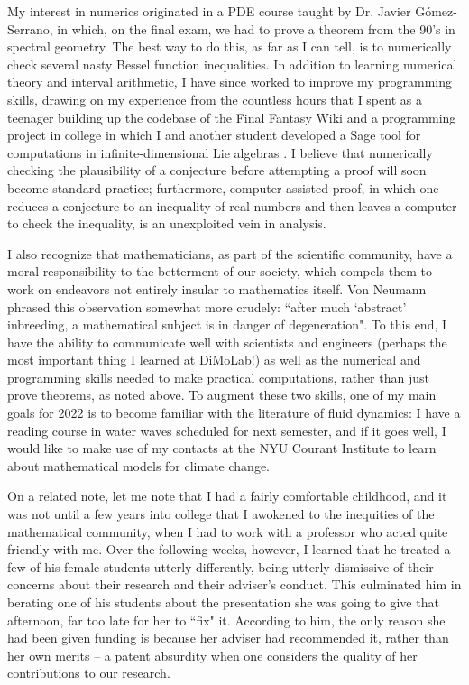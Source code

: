 \documentclass[11pt]{article}
\begin{document}
My interest in numerics originated in a PDE course taught by Dr. Javier G\'omez-Serrano, in which, on the final exam, we had to prove a theorem from the 90's in spectral geometry.
The best way to do this, as far as I can tell, is to numerically check several nasty Bessel function inequalities.
In addition to learning numerical theory and interval arithmetic, I have since worked to improve my programming skills, drawing on my experience from the countless hours that I spent as a teenager building up the codebase of the Final Fantasy Wiki \cite{ffwiki}
and a programming project in college in which I and another student developed a Sage tool for computations in infinite-dimensional Lie algebras \cite{lin2019}.
I believe that numerically checking the plausibility of a conjecture before attempting a proof will soon become standard practice; furthermore, computer-assisted proof, in which one reduces a conjecture to an inequality of real numbers and then leaves a computer to check the inequality, is an unexploited vein in analysis.

I also recognize that mathematicians, as part of the scientific community, have a moral responsibility to the betterment of our society, which compels them to work on endeavors not entirely insular to mathematics itself.
Von Neumann phrased this observation somewhat more crudely: ``after much `abstract' inbreeding, a mathematical subject is in danger of degeneration".
To this end, I have the ability to communicate well with scientists and engineers (perhaps the most important thing I learned at DiMoLab!) as well as the numerical and programming skills needed to make practical computations, rather than just prove theorems, as noted above.
To augment these two skills, one of my main goals for 2022 is to become familiar with the literature of fluid dynamics: I have a reading course in water waves scheduled for next semester, and if it goes well, I would like to make use of my contacts at the NYU Courant Institute to learn about mathematical models for climate change.

On a related note, let me note that I had a fairly comfortable childhood, and it was not until a few years into college that I awokened to the inequities of the mathematical community, when I had to work with a professor who acted quite friendly with me.
Over the following weeks, however, I learned that he treated a few of his female students utterly differently, being utterly dismissive of their concerns about their research and their adviser's conduct.
This culminated him in berating one of his students about the presentation she was going to give that afternoon, far too late for her to ``fix" it.
According to him, the only reason she had been given funding is because her adviser had recommended it, rather than her own merits -- a patent absurdity when one considers the quality of her contributions to our research.
\end{document}
